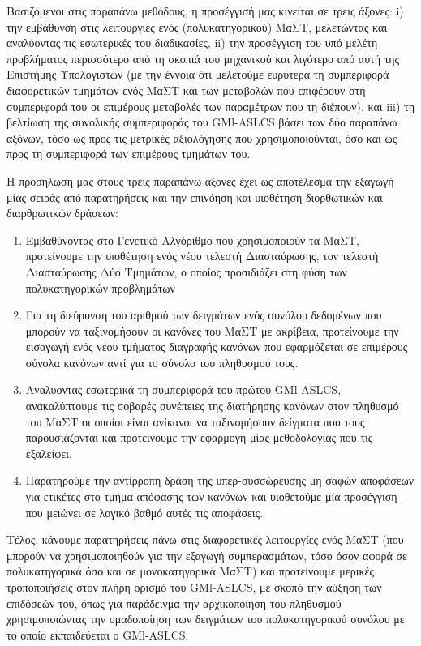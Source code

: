 Βασιζόμενοι στις παραπάνω μεθόδους, η προσέγγισή μας κινείται σε τρεις άξονες: i) την εμβάθυνση στις λειτουργίες ενός (πολυκατηγορικού) ΜαΣΤ, μελετώντας και αναλύοντας τις εσωτερικές του διαδικασίες, ii) την προσέγγιση του υπό μελέτη προβλήματος περισσότερο από τη σκοπιά του μηχανικού και λιγότερο από αυτή της Επιστήμης Υπολογιστών (με την έννοια ότι μελετούμε ευρύτερα τη συμπεριφορά διαφορετικών τμημάτων ενός ΜαΣΤ και των μεταβολών που επιφέρουν στη συμπεριφορά του οι επιμέρους μεταβολές των παραμέτρων που τη διέπουν), και iii) τη βελτίωση της συνολικής συμπεριφοράς του GMl-ASLCS βάσει των δύο παραπάνω αξόνων, τόσο ως προς τις μετρικές αξιολόγησης που χρησιμοποιούνται, όσο και ως προς τη συμπεριφορά των επιμέρους τμημάτων του.

Η προσήλωση μας στους τρεις παραπάνω άξονες έχει ως αποτέλεσμα την εξαγωγή μίας σειράς από παρατηρήσεις και την επινόηση και υιοθέτηση διορθωτικών και διαρθρωτικών δράσεων:
\begin{enumerate}
\item Εμβαθύνοντας στο Γενετικό Αλγόριθμο που χρησιμοποιούν τα ΜαΣΤ, προτείνουμε την υιοθέτηση ενός νέου τελεστή Διασταύρωσης, τον τελεστή Διασταύρωσης Δύο Τμημάτων, ο οποίος προσιδιάζει στη φύση των πολυκατηγορικών προβλημάτων
\item Για τη διεύρυνση του αριθμού των δειγμάτων ενός συνόλου δεδομένων που μπορούν να ταξινομήσουν οι κανόνες του ΜαΣΤ με ακρίβεια, προτείνουμε την εισαγωγή ενός νέου τμήματος διαγραφής κανόνων που εφαρμόζεται σε επιμέρους σύνολα κανόνων αντί για το σύνολο του πληθυσμού τους.
\item Αναλύοντας εσωτερικά τη συμπεριφορά του πρώτου GMl-ASLCS, ανακαλύπτουμε τις σοβαρές συνέπειες της διατήρησης κανόνων στον πληθυσμό του ΜαΣΤ οι οποίοι είναι ανίκανοι να ταξινομήσουν δείγματα που τους παρουσιάζονται και προτείνουμε την εφαρμογή μίας μεθοδολογίας που τις εξαλείφει.
\item Παρατηρούμε την αντίρροπη δράση της υπερ-συσσώρευσης μη σαφών αποφάσεων για ετικέτες στο τμήμα απόφασης των κανόνων και υιοθετούμε μία προσέγγιση που μειώνει σε λογικό βαθμό αυτές τις αποφάσεις.
\end{enumerate}

Τέλος, κάνουμε παρατηρήσεις πάνω στις διαφορετικές λειτουργίες ενός ΜαΣΤ (που μπορούν να χρησιμοποιηθούν για την εξαγωγή συμπερασμάτων, τόσο όσον αφορά σε πολυκατηγορικά όσο και σε μονοκατηγορικά ΜαΣΤ) και προτείνουμε μερικές τροποποιήσεις στον πλήρη ορισμό του GMl-ASLCS, με σκοπό την αύξηση των επιδόσεών του, όπως για παράδειγμα την αρχικοποίηση του πληθυσμού χρησιμοποιώντας την ομαδοποίηση των δειγμάτων του πολυκατηγορικού συνόλου με το οποίο εκπαιδεύεται ο GMl-ASLCS.

